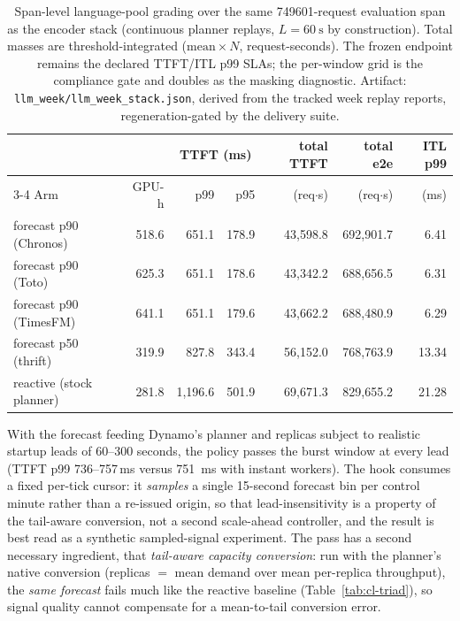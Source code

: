 \begin{table}[htbp]
\centering
\caption[Span-level language-pool stack, evaluation span]{Span-level
language-pool grading over the same \num{749601}-request evaluation span as
the encoder stack (continuous planner replays, $L{=}\SI{60}{\second}$ by
construction). Total masses are threshold-integrated ($\text{mean}\times
N$, request-seconds). The frozen endpoint remains the declared TTFT/ITL p99
SLAs; the per-window grid is the compliance gate and doubles as the
masking diagnostic. Artifact:
\texttt{llm\_week/llm\_week\_stack.json}, derived from the tracked week
replay reports, regeneration-gated by the delivery suite.}
\label{tab:cl-llm-week-stack}
\footnotesize
\setlength{\tabcolsep}{4pt}
\begin{tabular}{@{}lrrrrrr@{}}
\toprule
& & \multicolumn{2}{c}{TTFT (ms)} & total TTFT & total e2e & ITL p99 \\
\cmidrule(lr){3-4}
Arm & GPU-h & p99 & p95 & (req$\cdot$s) & (req$\cdot$s) & (ms) \\
\midrule
forecast p90 (Chronos) & 518.6 & 651.1 & 178.9 & 43{,}598.8 & 692{,}901.7 & 6.41 \\
forecast p90 (Toto)    & 625.3 & 651.1 & 178.6 & 43{,}342.2 & 688{,}656.5 & 6.31 \\
forecast p90 (TimesFM) & 641.1 & 651.1 & 179.6 & 43{,}662.2 & 688{,}480.9 & 6.29 \\
forecast p50 (thrift)  & 319.9 & 827.8 & 343.4 & 56{,}152.0 & 768{,}763.9 & 13.34 \\
reactive (stock planner) & 281.8 & 1{,}196.6 & 501.9 & 69{,}671.3 & 829{,}655.2 & 21.28 \\
\bottomrule
\end{tabular}
\end{table}

With the forecast feeding Dynamo's planner and replicas subject to realistic
startup leads of 60--300 seconds, the policy passes the burst window at every
lead (TTFT p99 736--757\,\si{\milli\second} versus \SI{751}{\milli\second} with
instant workers). The hook consumes a fixed per-tick cursor: it
\emph{samples} a single 15-second forecast bin per control minute rather than a
re-issued origin, so that lead-insensitivity is a property of the tail-aware
conversion, not a second scale-ahead controller, and the result is best read as
a synthetic sampled-signal experiment. The pass has a second necessary
ingredient, that \emph{tail-aware capacity conversion}: run with the planner's
native conversion (replicas $=$ mean demand over mean per-replica throughput),
the \emph{same forecast} fails much like the reactive baseline
(Table~\ref{tab:cl-triad}), so signal quality cannot compensate for a
mean-to-tail conversion error.

